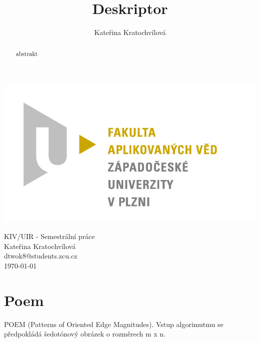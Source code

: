 \documentclass{report}
\title{Deskriptor}
\author{Kateřina Kratochvílová}
\begin{document}
 
\begin{titlepage}
\begin{flushleft} 
{\includegraphics[width=.5\textwidth]{./img/fav_logo.jpg}\\[3cm]}
\end{flushleft}
\begin{center}

{\Huge KIV/UIR - Semestrální práce}
\\[0.3cm]
\vspace{1.7cm}
{\Large Kateřina Kratochvílová} \\
\vspace{0.2cm}
{\normalsize dtwok8@students.zcu.cz}\\

{\large \today}
\end{center}
\end{titlepage}


\tableofcontents

\begin{abstract}
abstrakt  
\end{abstract}


\chapter{Poem}
POEM (Patterns of Oriented Edge Magnitudes). Vstup algorimutmu se předpokládá šedotónový obrázek o rozměrech  m x n.
\end{document}
